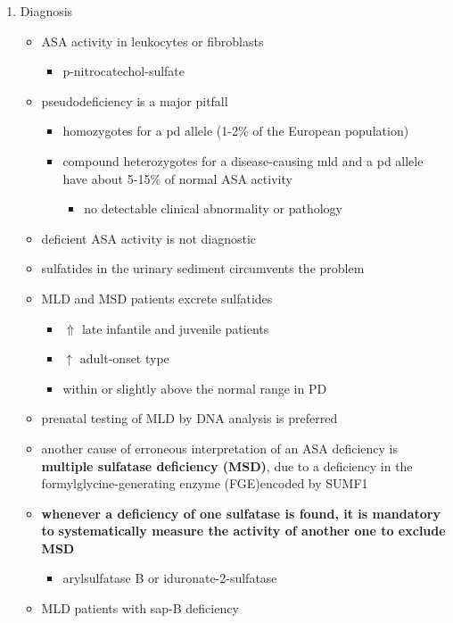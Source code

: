 \documentclass{scrartcl}
\begin{document}
\begin{enumerate}
\item Diagnosis
\label{sec:org2d74d3e}

\begin{itemize}
\item ASA activity in leukocytes or fibroblasts
\begin{itemize}
\item p-nitrocatechol-sulfate
\end{itemize}
\item pseudodeficiency is a major pitfall
\begin{itemize}
\item homozygotes for a pd allele (1-2\% of the European population)
\item compound heterozygotes for a disease-causing mld and a pd allele
have about 5-15\% of normal ASA activity
\begin{itemize}
\item no detectable clinical abnormality or pathology
\end{itemize}
\end{itemize}
\item deficient ASA activity is not diagnostic
\item sulfatides in the urinary sediment circumvents the problem
\item MLD and MSD patients excrete sulfatides
\begin{itemize}
\item \(\Uparrow\) late infantile and juvenile patients
\item \(\uparrow\) adult-onset type
\item within or slightly above the normal range in PD
\end{itemize}
\item prenatal testing of MLD by DNA analysis is preferred
\item another cause of erroneous interpretation of an ASA deficiency is
\textbf{multiple sulfatase deficiency (MSD)}, due to a deficiency in the
formylglycine-generating enzyme (FGE)encoded by SUMF1
\item \textbf{whenever a deficiency of one sulfatase is found, it is mandatory to}
\textbf{systematically measure the activity of another one to exclude MSD}
\begin{itemize}
\item arylsulfatase B or iduronate-2-sulfatase
\end{itemize}
\item MLD patients with sap-B deficiency
\begin{itemize}

\end{itemize}
\end{itemize}
\end{enumerate}
\end{document}
